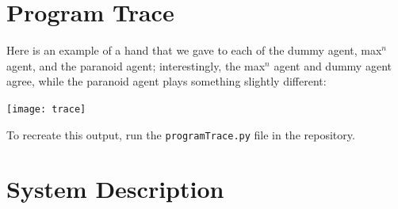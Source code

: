 \documentclass[11pt]{article}
\begin{document}
\appendix

\section{Program Trace}

Here is an example of a hand that we gave to each of the dummy agent, max$^n$ agent, and the paranoid agent; interestingly, the max$^n$ agent and dummy agent agree, while the paranoid agent plays something slightly different:
\begin{center}
  \texttt{[image: trace]}
\end{center}

To recreate this output, run the \verb|programTrace.py| file in the repository.


\section{System Description}
\end{document}
